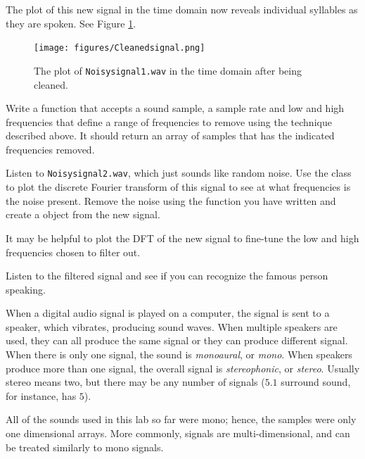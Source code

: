 The plot of this new signal in the time domain now reveals individual syllables as they are spoken.
See Figure \ref{fig:cleansignal}. %

\begin{figure}[H]
    \centering
    \texttt{[image: figures/Cleanedsignal.png]}
    \caption{The plot of \texttt{Noisysignal1.wav} in the time domain after being cleaned.}
    \label{fig:cleansignal}
\end{figure}

\begin{problem} %
Write a function that accepts a sound sample, a sample rate and low and high frequencies that define a range of frequencies to remove using the technique described above. 
It should return an array of samples that has the indicated frequencies removed. 

Listen to \texttt{Noisysignal2.wav}, which just sounds like random noise. 
Use the  class to plot the discrete Fourier transform of this signal to see at what frequencies is the noise present. 
Remove the noise using the function you have written and create a  object from the new signal. 

It may be helpful to plot the DFT of the new signal to fine-tune the low and high frequencies chosen to filter out. 

Listen to the filtered signal and see if you can recognize the famous person speaking. 
\end{problem}

When a digital audio signal is played on a computer, the signal is sent to a speaker, which vibrates, producing sound waves.  
When multiple speakers are used, they can all produce the same signal or they can produce different signal. 
When there is only one signal, the sound is \emph{monoaural}, or \emph{mono}.  When speakers produce more than one signal, the overall signal is \emph{stereophonic}, or \emph{stereo}.  Usually stereo means two, but there may be any number of signals ($5.1$ surround sound, for instance, has $5$). 

All of the sounds used in this lab so far were mono; hence, the samples were only one dimensional arrays. 
More commonly, signals are multi-dimensional, and can be treated similarly to mono signals.  

